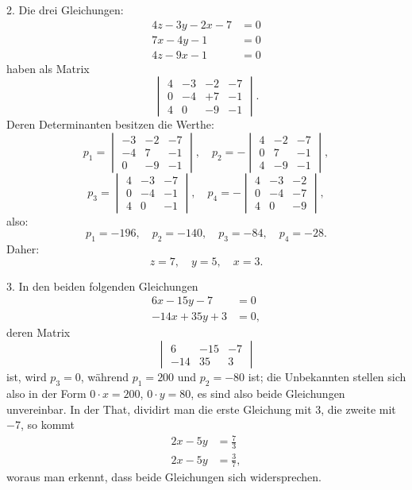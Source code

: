 \documentclass[11pt]{article}
\begin{document}
2. Die drei Gleichungen:
\[
\begin{aligned}
4z-3y-2x-7&=0\\
7x-4y-1&=0\\
4z-9x-1&=0
\end{aligned}
\]
haben als Matrix
\[
\begin{vmatrix}
4 & -3 & -2 & -7\\
0 & -4 & +7 & -1\\
4 & 0 & -9 & -1
\end{vmatrix}.
\]
Deren Determinanten besitzen die Werthe:
\[
p_1=\begin{vmatrix} -3 & -2 & -7\\ -4 & 7 & -1\\ 0 & -9 & -1 \end{vmatrix},
\quad
p_2=-\begin{vmatrix} 4 & -2 & -7\\ 0 & 7 & -1\\ 4 & -9 & -1 \end{vmatrix},
\]
\[
p_3=\begin{vmatrix} 4 & -3 & -7\\ 0 & -4 & -1\\ 4 & 0 & -1 \end{vmatrix},
\quad
p_4=-\begin{vmatrix} 4 & -3 & -2\\ 0 & -4 & -7\\ 4 & 0 & -9 \end{vmatrix},
\]
also:
\[
p_1=-196,\quad p_2=-140,\quad p_3=-84,\quad p_4=-28.
\]
Daher:
\[
z=7,\quad y=5,\quad x=3.
\]

3. In den beiden folgenden Gleichungen
\[
\begin{aligned}
6x-15y-7&=0\\
-14x+35y+3&=0,
\end{aligned}
\]
deren Matrix
\[
\begin{vmatrix}
6 & -15 & -7\\
-14 & 35 & 3
\end{vmatrix}
\]
ist, wird $p_3=0$, während $p_1=200$ und $p_2=-80$ ist; die Unbekannten stellen sich also in der Form $0\cdot x=200$, $0\cdot y=80$, es sind also beide Gleichungen unvereinbar. In der That, dividirt man die erste Gleichung mit 3, die zweite mit $-7$, so kommt
\[
\begin{aligned}
2x-5y&=\frac{7}{3}\\
2x-5y&=\frac{3}{7},
\end{aligned}
\]
woraus man erkennt, dass beide Gleichungen sich widersprechen.
\end{document}
